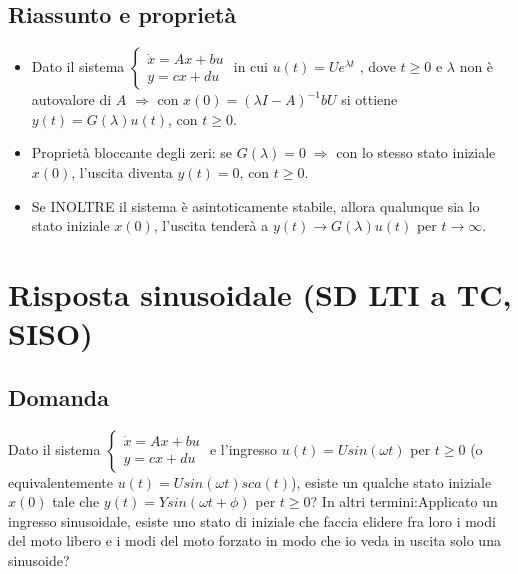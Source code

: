 \subsection{Riassunto e proprietà}
\begin{itemize}
    \item Dato il sistema $\begin{cases}
        \dot{x} = Ax +bu\\ 
        y = cx +du
    \end{cases}$ in cui $u(t) = Ue^{\lambda t}$ , dove $t\geq 0$ e $\lambda$ non è autovalore di $A$ $\Longrightarrow$ con $x(0) = (\lambda I -A)^{-1} b U$ si ottiene $y(t) = G(\lambda) u(t)$, con $t\geq 0$.
    \item Proprietà bloccante degli zeri: se $G(\lambda) = 0 \; \Longrightarrow$ con lo stesso stato iniziale $x(0)$, l'uscita diventa $y(t) = 0$, con $t\geq 0$.
    \item Se INOLTRE il sistema è asintoticamente stabile, allora qualunque sia lo stato iniziale $x(0)$, l'uscita tenderà a $y(t) \rightarrow G(\lambda) u(t)$ per $t \rightarrow  \infty$.
\end{itemize}
\newpage
\section{Risposta sinusoidale (SD LTI a TC, SISO)}
\subsection{Domanda}
Dato il sistema $\begin{cases}
    \dot{x} = Ax +bu\\ 
    y = cx +du
\end{cases}$ e l'ingresso $u(t) = U sin(\omega t)$ per $t\geq 0$ (o equivalentemente $u(t) = U sin(\omega t) sca(t)$), esiste un qualche stato iniziale $x(0)$ tale che $y(t) = Y sin(\omega t + \phi)$ per $t \geq 0$?\newline
\newline
In altri termini: Applicato un ingresso sinusoidale, esiste uno stato di iniziale che faccia elidere fra loro i modi del moto libero e i modi del moto forzato in modo che io veda in uscita solo una sinusoide?
